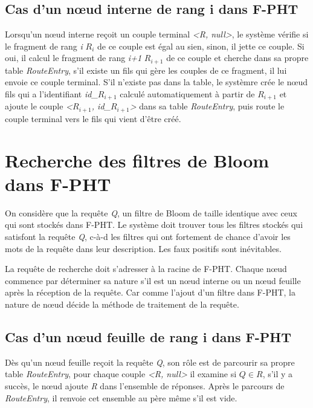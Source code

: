 \documentclass[a4paper,11pt]{report}
\begin{document}
\subsection{Cas d'un nœud interne de rang i dans F-PHT}
	Lorsqu'un nœud interne reçoit un couple terminal \textit{<R, null>}, le système vérifie si le fragment de rang \textit{i} \textit{$R_{i}$} de ce couple est égal au sien, sinon, il jette ce couple. Si oui, il calcul le fragment de rang \textit{i+1} \textit{$R_{i+1}$} de ce couple et cherche dans sa propre table \textit{RouteEntry}, s'il existe un fils qui gère les couples de ce fragment, il lui envoie ce couple terminal. S'il n'existe pas dans la table, le systèmre crée le nœud fils qui a l'identifiant \textit{id\_$R_{i+1}$} calculé automatiquement à partir de \textit{$R_{i+1}$} et ajoute le couple \textit{<\textit{$R_{i+1}$}, \textit{id\_$R_{i+1}$}>} dans sa table \textit{RouteEntry}, puis route le couple terminal vers  le fils qui vient d'être créé.
	
\section{Recherche des filtres de Bloom dans F-PHT}
	On considère que la requête \textit{Q}, un filtre de Bloom de taille identique avec ceux qui sont stockés dans F-PHT. Le système doit trouver tous les filtres stockés qui satisfont la requête \textit{Q}, c-à-d les filtres qui ont fortement de chance d'avoir les mots de la requête dans leur description. Les faux positifs sont inévitables.
	
	La requête de recherche doit s'adresser à la racine de F-PHT. Chaque nœud commence par déterminer sa nature s'il est un nœud interne ou un nœud  feuille  après la réception de la requête. Car comme l'ajout d'un filtre dans F-PHT, la nature de nœud décide la méthode de traitement de la requête.
	
\subsection{Cas d'un nœud feuille de rang i dans F-PHT}
	Dès qu'un nœud feuille reçoit la requête \textit{Q}, son rôle est de parcourir sa propre table \textit{RouteEntry}, pour chaque couple \textit{<R, null>} il examine si $Q \in R$, s'il y a succès, le nœud ajoute \textit{R} dans l'ensemble de réponses. Après le parcours de \textit{RouteEntry}, il renvoie cet ensemble au père même s'il est vide.
	
\end{document}
